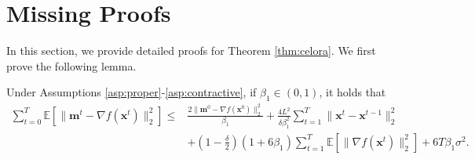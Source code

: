 \section{Missing Proofs}\label{app:proof}

In this section, we provide detailed proofs for Theorem \ref{thm:celora}. We first prove the following lemma.

\begin{lemma}\label{lm:m}
    Under Assumptions \ref{asp:proper}-\ref{asp:contractive}, if $\beta_1\in(0,1)$, it holds that
    \begin{align}
        \sum_{t=0}^T\mathbb{E}[\|\mathbf{m}^t-\nabla f(\mathbf{x}^t)\|_2^2]\le&\frac{2\|\mathbf{m}^0-\nabla f(\mathbf{x}^0)\|_2^2}{\beta_1}+\frac{4L^2}{\delta\beta_1^2}\sum_{t=1}^T\|\mathbf{x}^t-\mathbf{x}^{t-1}\|_2^2\nonumber\\
        &+\left(1-\frac{\delta}{2}\right)(1+6\beta_1)\sum_{t=1}^T\mathbb{E}[\|\nabla f(\mathbf{x}^t)\|_2^2]+6T\beta_1\sigma^2.\label{eq:lm-m}
    \end{align}
\end{lemma}
